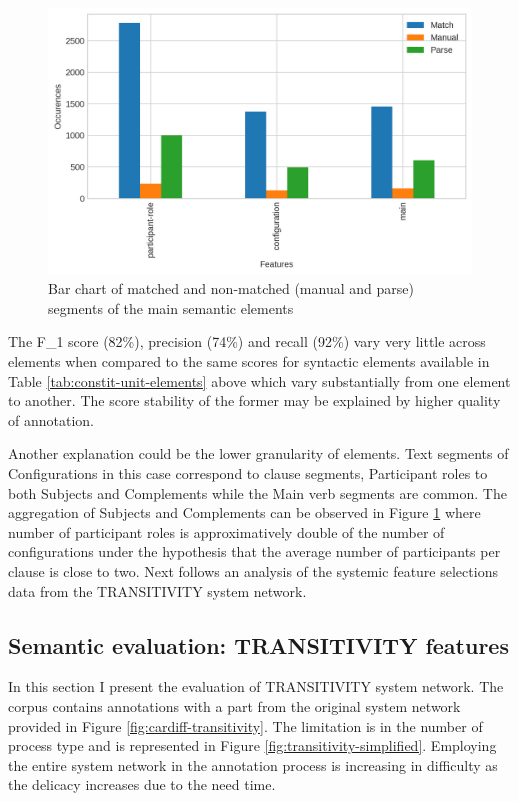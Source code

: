 \begin{figure}[!ht]
    \centering
    \includegraphics[width=.65\textwidth]{evaluation-results/figures/accuracy-semantic-figure-elements}
    \caption{Bar chart of matched and non-matched (manual and parse) segments of the main semantic elements}
    \label{fig:configuration-elements}
\end{figure}

The F_1 score (82\%), precision (74\%) and recall (92\%) vary very little across elements when compared to the same scores for syntactic elements available in Table \ref{tab:constit-unit-elements} above which vary substantially from one element to another. The score stability of the former may be explained by higher quality of annotation. 

Another explanation could be the lower granularity of elements. Text segments of Configurations in this case correspond to clause segments, Participant roles to both Subjects and Complements while the Main verb segments are common. The aggregation of Subjects and Complements can be observed in Figure \ref{fig:configuration-elements} where number of participant roles is approximatively double of the number of configurations under the hypothesis that the average number of participants per clause is close to two. Next follows an analysis of the systemic feature selections data from the TRANSITIVITY system network. 

\subsection{Semantic evaluation: TRANSITIVITY features}
\label{sec:semantic-features}
In this section I present the evaluation of TRANSITIVITY system network. The corpus contains annotations with a part from the original system network provided in Figure \ref{fig:cardiff-transitivity}. The limitation is in the number of process type and is represented in Figure \ref{fig:transitivity-simplified}. Employing the entire system network in the annotation process is increasing in difficulty as the delicacy increases due to the need time. 

